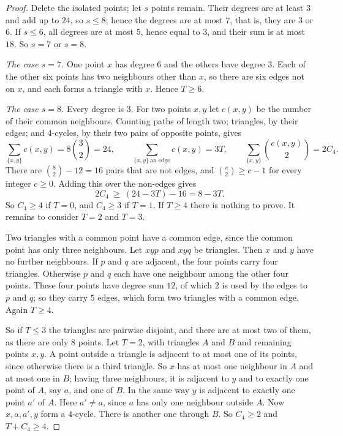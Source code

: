 \documentclass[11pt,a4paper]{article}
\begin{document}
\begin{proof}
Delete the isolated points; let $s$ points remain. Their degrees are at
least $3$ and add up to $24$, so $s\le 8$; hence the degrees are at most
$7$, that is, they are $3$ or $6$. If $s\le 6$, all degrees are at most
$5$, hence equal to $3$, and their sum is at most $18$. So $s=7$ or $s=8$.

\emph{The case $s=7$.} One point $x$ has degree $6$ and the others have
degree $3$. Each of the other six points has two neighbours other than $x$,
so there are six edges not on $x$, and each forms a triangle with $x$.
Hence $T\ge 6$.

\emph{The case $s=8$.} Every degree is $3$. For two points $x,y$ let
$c(x,y)$ be the number of their common neighbours. Counting paths of length
two; triangles, by their edges; and $4$-cycles, by their two pairs of
opposite points, gives
\[
\sum_{\{x,y\}}c(x,y)=8\binom32=24,\qquad
\sum_{\{x,y\}\ \text{an edge}}c(x,y)=3T,\qquad
\sum_{\{x,y\}}\binom{c(x,y)}2=2C_4 .
\]
There are $\binom82-12=16$ pairs that are not edges, and
$\binom c2\ge c-1$ for every integer $c\ge 0$. Adding this over the
non-edges gives
\[
2C_4\ \ge\ (24-3T)-16=8-3T .
\]
So $C_4\ge 4$ if $T=0$, and $C_4\ge 3$ if $T=1$. If $T\ge 4$ there is
nothing to prove. It remains to consider $T=2$ and $T=3$.

Two triangles with a common point have a common edge, since the common
point has only three neighbours. Let $xyp$ and $xyq$ be triangles. Then $x$
and $y$ have no further neighbours. If $p$ and $q$ are adjacent, the four
points carry four triangles. Otherwise $p$ and $q$ each have one neighbour
among the other four points. These four points have degree sum $12$, of
which $2$ is used by the edges to $p$ and $q$; so they carry $5$ edges,
which form two triangles with a common edge. Again $T\ge 4$.

So if $T\le 3$ the triangles are pairwise disjoint, and there are at most
two of them, as there are only $8$ points. Let $T=2$, with triangles $A$ and
$B$ and remaining points $x,y$. A point outside a triangle is adjacent to
at most one of its points, since otherwise there is a third triangle. So
$x$ has at most one neighbour in $A$ and at most one in $B$; having three
neighbours, it is adjacent to $y$ and to exactly one point of $A$, say
$a$, and one of $B$. In the same way $y$ is adjacent to exactly one point
$a'$ of $A$. Here $a'\ne a$, since $a$ has only one neighbour outside $A$.
Now $x,a,a',y$ form a $4$-cycle. There is another one through $B$. So
$C_4\ge 2$ and $T+C_4\ge 4$.
\end{proof}
\end{document}
